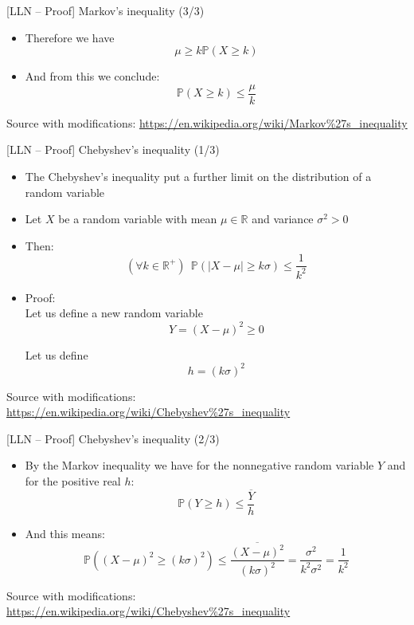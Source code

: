 \documentclass{beamer}
\begin{document}
\begin{frame}
{\centerline{[LLN -- Proof] Markov's inequality (3/3)}}

\begin{itemize}
\item Therefore we have
$$ \mu \geq  k \mathbb{P} ( X  \geq k) $$
\item And from this we conclude:
$$  \mathbb{P} ( X  \geq k) \leq \frac{\mu}{k}$$

\end{itemize}
 
\begin{center}
\tiny 
Source with modifications: \url{https://en.wikipedia.org/wiki/Markov\%27s_inequality}
\end{center}

\end{frame}




\begin{frame}
{\centerline{[LLN -- Proof] Chebyshev's inequality (1/3)}}

\begin{itemize}
\item The Chebyshev's inequality put a further limit on the distribution of a random variable
\item Let $X$ be a random variable with mean $\mu \in \mathbb{R}$ and variance $\sigma^2 > 0$
\item Then:
$$ (\forall k \in \mathbb{R}^+) ~~  \mathbb{P} ( |X - \mu| \geq k\sigma) \leq \frac{1}{k^2} $$
\item Proof:\\
Let us define a new random variable
$$Y = (X - \mu)^2 \geq 0$$

Let us define
$$h = {(k\sigma)}^2$$


\end{itemize}


\begin{center}
\tiny 
Source with modifications: \url{https://en.wikipedia.org/wiki/Chebyshev\%27s_inequality}
\end{center}
\end{frame}


\begin{frame}
{\centerline{[LLN -- Proof] Chebyshev's inequality (2/3)}}

\begin{itemize}
\item By the Markov inequality we have for the nonnegative random variable $Y$ and for the positive real $h$:
$$\mathbb{P} ( Y  \geq h) \leq \frac{\overline{Y}}{h}$$
\item And this means:
$$\mathbb{P} ( (X - \mu)^2  \geq {(k\sigma)}^2) \leq \frac{\overline{(X - \mu)^2}}{{(k\sigma)}^2}= \frac{\sigma^2}{k^2\sigma^2}= \frac{1}{k^2}$$


\end{itemize}


\begin{center}
\tiny 
Source with modifications: \url{https://en.wikipedia.org/wiki/Chebyshev\%27s_inequality}
\end{center}
\end{frame}
\end{document}
